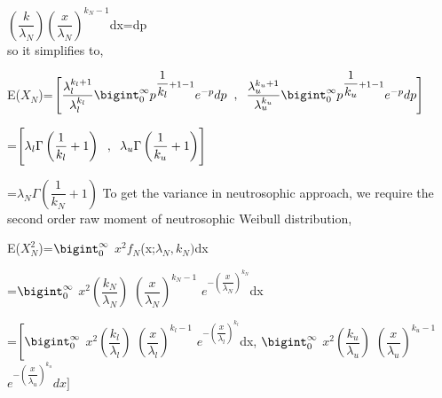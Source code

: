 \documentclass[12pt,a4paper,oneside]{article}
\begin{document}
\hspace{2cm}$\left(\dfrac{k}{\lambda_{N}}\right)\left(\dfrac{x}{{\lambda_{N}}}\right)^{k_{N}-1}$dx=dp\\
\newline so it simplifies to,
\begin{center}
E($X_{N}$)=$\Biggl[\dfrac{\lambda_{l}^{k_{l}+1}}{\lambda_{l}^{k_{l}}} \bigint_{0}^{\infty} p^{\dfrac{1}{k_{l}}+1-1}e^{-p}dp\hspace{2mm},\hspace{2mm}\dfrac{\lambda_{u}^{k_{u}+1}}{\lambda_{u}^{k_{u}}} \bigint_{0}^{\infty} p^{\dfrac{1}{k_{u}}+1-1}e^{-p}dp\Biggr]$
\end{center}
\begin{singlespace}
\hspace*{4.5cm}=$\Biggl[{\lambda_{l}}\Gamma\left(\dfrac{1}{k_{l}}+1\right)\hspace{2mm},\hspace{2mm}{\lambda_{u}}\Gamma\left(\dfrac{1}{k_{u}}+1\right)\Biggr]$
\end{singlespace}
\hspace*{4.5cm}=$\boxed{{\lambda_{N}}\Gamma\left(\dfrac{1}{k_{N}}+1\right)}$
\newline\newline
To get the variance in neutrosophic approach, we require the second order raw moment of neutrosophic Weibull distribution,\\
\begin{center}
E($X_{N}^{2}$)=$\bigint_{0}^{\infty}$ $x^{2}f_{N}$(x;${\lambda_{N}},k_{N})$dx\newline\newline
\begin{singlespace}
\hspace{1cm}=$\bigint_{0}^{\infty}$ $x^{2}\left(\dfrac{k_{N}}{{\lambda_{N}}}\right)$ $\left(\dfrac{x}{\lambda_{N}}\right)^{k_{N}-1}$ $e^{-\left(\dfrac{x}{\lambda_{N}}\right)^{k_{N}}}$dx
\end{singlespace}\vspace*{1cm}
=$\Biggl[\bigint_{0}^{\infty}$ $x^{2}\left(\dfrac{k_{l}}{{\lambda_{l}}}\right)$ $\left(\dfrac{x}{\lambda_{l}}\right)^{k_{l}-1}$ $e^{-\left(\dfrac{x}{\lambda_{l}}\right)^{k_{l}}}$dx\hspace{2mm},\hspace{2mm} $\bigint_{0}^{\infty}$ $x^{2}\left(\dfrac{k_{u}}{{\lambda_{u}}}\right)$ $\left(\dfrac{x}{\lambda_{u}}\right)^{k_{u}-1}$ $e^{-\left(\dfrac{x}{\lambda_{u}}\right)^{k_{u}}}dx\Biggr]$
\end{center}
\end{document}
